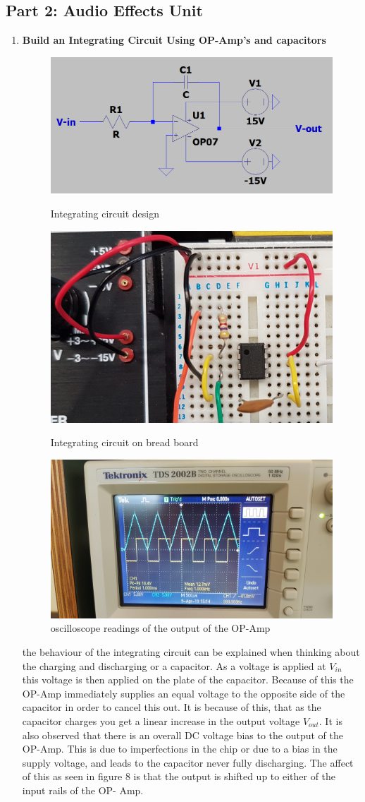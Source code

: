 \documentclass[a4paper,11pt]{article}
\begin{document}
\begin{flushleft}
	\section*{Part 2: Audio Effects Unit}
		\begin{enumerate}
		\item %
			\textbf{Build an Integrating Circuit Using OP-Amp's and capacitors}
			\begin{figure}[ht]
				\centering
				\includegraphics[width=0.6\linewidth]{integrating}
				\caption{Integrating circuit design}
				\includegraphics[width=0.6\linewidth]{integrator}
				\caption{Integrating circuit on bread board}
				\includegraphics[width=0.6\linewidth]{scope_readout}
				\caption{oscilloscope readings of the output of the OP-Amp}
			\end{figure}
			the behaviour of the integrating circuit can be explained when thinking about the charging 					and discharging or a capacitor. As a voltage is applied at $V_{in}$ this voltage is then 					applied on the plate of the capacitor. Because of this the OP-Amp immediately supplies an 					equal voltage to the opposite side of the capacitor in order to cancel this out. It is 						because of this, that as the capacitor charges you get a linear increase in the output 						voltage $V_{out}$. It is  also observed that there is an overall DC voltage bias to the 					output of the OP-Amp. This is due to imperfections in the chip or due to a bias in the 						supply voltage, and leads to the capacitor never fully discharging. The affect of this as 					seen in figure 8 is that the output is shifted up to either of the  input rails of the OP-					Amp.

\end{enumerate}
\end{flushleft}
\end{document}
